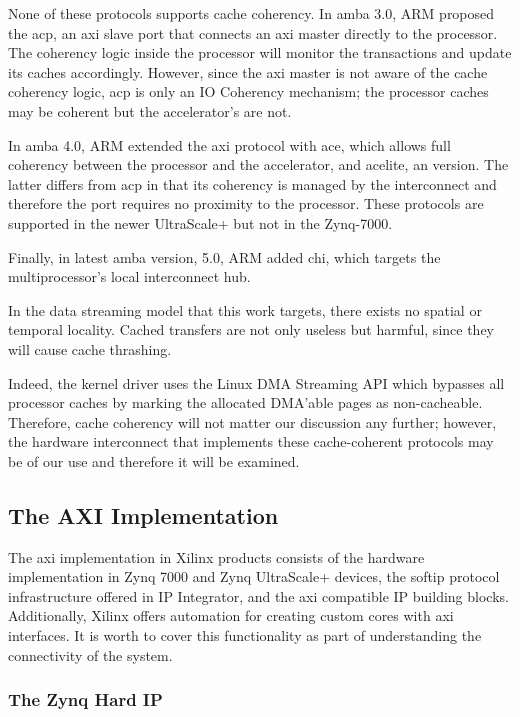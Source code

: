 None of these protocols supports cache coherency.
In \gls{amba} 3.0, ARM proposed the \gls{acp},
an \gls{axi} slave port that connects an \gls{axi} master directly to the processor.
The coherency logic inside the processor
will monitor the transactions and update its caches accordingly.
However, since the \gls{axi} master is not aware of the cache coherency logic,
\gls{acp} is only an \gls{IO Coherency} mechanism;
the processor caches may be coherent but the accelerator's are not.

In \gls{amba} 4.0, ARM extended the \gls{axi} protocol with \gls{ace},
which allows full coherency between the processor and the accelerator,
and \gls{acelite}, an  version.
The latter differs from \gls{acp} in that its coherency is managed
by the interconnect and therefore the port requires no proximity
to the processor.
These protocols are supported in the newer UltraScale+ but not in the Zynq-7000.

Finally, in latest \gls{amba} version, 5.0, ARM added \gls{chi},
which targets the multiprocessor's local interconnect hub.

In the data streaming model that this work targets,
there exists no spatial or temporal locality.
Cached transfers are not only useless but harmful,
since they will cause cache thrashing.

Indeed, the kernel driver uses the Linux DMA Streaming API
which bypasses all processor caches by marking
the allocated DMA'able pages as non-cacheable.
Therefore, cache coherency will not matter our discussion any further;
however, the hardware interconnect that implements these cache-coherent
protocols may be of our use and therefore it will be examined.

\subsection{The AXI Implementation}

The \gls{axi} implementation in Xilinx products consists of the hardware
implementation in Zynq 7000 and Zynq UltraScale+ devices,
the \gls{softip} protocol infrastructure offered in IP Integrator,
and the \gls{axi} compatible IP building blocks.
Additionally, Xilinx offers automation for creating
custom cores with \gls{axi} interfaces.
It is worth to cover this functionality as
part of understanding the connectivity of the system.

\subsubsection{The Zynq Hard IP}

